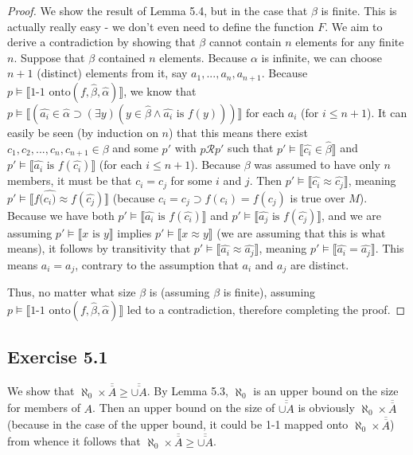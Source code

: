\documentclass{article}
\newcommand{\lbc}{\llbracket}
\newcommand{\rbc}{\rrbracket}
\theoremstyle{definition}
\begin{document}
\begin{proof}
We show the result of Lemma 5.4, but in the case that $\beta$ is finite. This is actually really easy - we don't even need to 
define the function $F$. We aim to derive a contradiction by showing that $\beta$ cannot contain $n$ elements for any finite $n$.
Suppose that $\beta$ contained $n$ elements. Because $\alpha$ is infinite, we can choose $n+1$ (distinct) elements from it, 
say $a_1,...,a_n,a_{n+1}$. Because $p\vDash\lbc\textrm{1-1 onto}(f,\hat{\beta},\hat{\alpha})\rbc$, we know that 
$p\vDash\lbc(\hat{a_i}\in\hat{\alpha}\supset(\exists y)(y\in\hat{\beta}\wedge\hat{a_i}\textrm{ is }f(y)))\rbc$ for 
each $a_i$ (for $i\le n+1$). It can easily
be seen (by induction on $n$) that this means there exist $c_1,c_2,...,c_n,c_{n+1}\in\beta$ and some 
$p'$ with $p\mathcal{R}p'$ such that $p'\vDash\lbc\hat{c_i}\in\hat{\beta}\rbc$ and 
$p'\vDash\lbc\hat{a_i}\textrm{ is }f(\hat{c_i})\rbc$ (for each $i\le n+1$). Because 
$\beta$ was assumed to have only $n$ members, it must be that $c_i=c_j$ for some 
$i$ and $j$. Then $p'\vDash\lbc\hat{c_i}\approx\hat{c_j}\rbc$, meaning 
$p'\vDash\lbc f(\hat{c_i)}\approx f(\hat{c_j})\rbc$ (because $c_i=c_j\supset f(c_i)=f(c_j)$ is true over $M$). Because we have 
both $p'\vDash\lbc \hat{a_i}\textrm{ is }f(\hat{c_i})\rbc$ and
$p'\vDash\lbc\hat{a_j}\textrm{ is }f(\hat{c_j})\rbc$, and we are assuming
$p'\vDash\lbc x\textrm{ is }y\rbc$ implies $p'\vDash\lbc x\approx y\rbc$ (we are assuming that this is 
what  means), it follows by transitivity that 
$p'\vDash\lbc\hat{a_i}\approx\hat{a_j}\rbc$, meaning $p'\vDash\lbc\hat{a_i}=\hat{a_j}\rbc$. This 
means $a_i=a_j$, contrary to the assumption that $a_i$ and $a_j$ are distinct. 

Thus, no matter what size $\beta$ is (assuming $\beta$ is finite), assuming 
$p\vDash\lbc\textrm{1-1 onto}(f,\hat{\beta},\hat{\alpha})\rbc$ led to a contradiction, therefore completing the proof.
\end{proof}

\subsection*{Exercise 5.1}
We show that $\aleph_0\times\overline{\overline{A}}\ge\overline{\overline{\cup A}}$. By Lemma 5.3, 
$\aleph_0$ is an upper bound on the size for members of $A$. Then an upper bound on the size of 
$\overline{\overline{\cup A}}$ is obviously $\aleph_0\times\overline{\overline{A}}$ (because in the 
case of the upper bound, it could be 1-1 mapped onto $\aleph_0\times\overline{\overline{A}}$) from 
whence it follows that $\aleph_0\times\overline{\overline{A}}\ge\overline{\overline{\cup A}}$.
\end{document}
